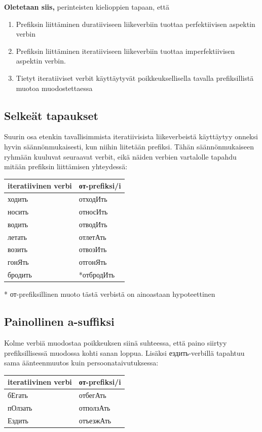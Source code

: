 \documentclass[]{scrreprt}
\providecommand{\tightlist}{%
  \setlength{\itemsep}{0pt}\setlength{\parskip}{0pt}}
\begin{document}
\textbf{Oletetaan siis,} perinteisten kielioppien tapaan, että

\begin{enumerate}
\def\labelenumi{\arabic{enumi}.}
\tightlist
\item
  Prefiksin liittäminen duratiiviseen liikeverbiin tuottaa
  perfektiivisen aspektin verbin
\item
  Prefiksin liittäminen iteratiiviseen liikeverbiin tuottaa
  imperfektiivisen aspektin verbin.
\item
  Tietyt iteratiiviset verbit käyttäytyvät poikkeuksellisella tavalla
  prefiksillistä muotoa muodostettaessa
\end{enumerate}

\subsection{Selkeät tapaukset}\label{selkeuxe4t-tapaukset}

Suurin osa etenkin tavallisimmista iteratiivisista liikeverbeistä
käyttäytyy onneksi hyvin säännönmukaisesti, kun niihin liitetään
prefiksi. Tähän säännönmukaiseen ryhmään kuuluvat seuraavat verbit, eikä
näiden verbien vartalolle tapahdu mitään prefiksin liittämisen
yhteydessä:

\begin{longtable}[c]{@{}ll@{}}
\toprule
iteratiivinen verbi & от-prefiksi/i\tabularnewline
\midrule
\endhead
ходить & отходИть\tabularnewline
носить & относИть\tabularnewline
водить & отводИть\tabularnewline
летать & отлетАть\tabularnewline
возить & отвозИть\tabularnewline
гонЯть & отгонЯть\tabularnewline
бродить & *отбродИть\tabularnewline
\bottomrule
\end{longtable}

* от-prefiksillinen muoto tästä verbistä on ainoastaan hypoteettinen

\subsection{Painollinen a-suffiksi}\label{painollinen-a-suffiksi}

Kolme verbiä muodostaa poikkeuksen siinä suhteessa, että paino siirtyy
prefiksillisessä muodossa kohti sanan loppua. Lisäksi ездить-verbillä
tapahtuu sama äänteenmuutos kuin persoonataivutuksessa:

\begin{longtable}[c]{@{}ll@{}}
\toprule
iteratiivinen verbi & от-prefiksi/i\tabularnewline
\midrule
\endhead
бЕгать & отбегАть\tabularnewline
пОлзать & отползАть\tabularnewline
Ездить & отъезжАть\tabularnewline
\bottomrule
\end{longtable}
\end{document}
